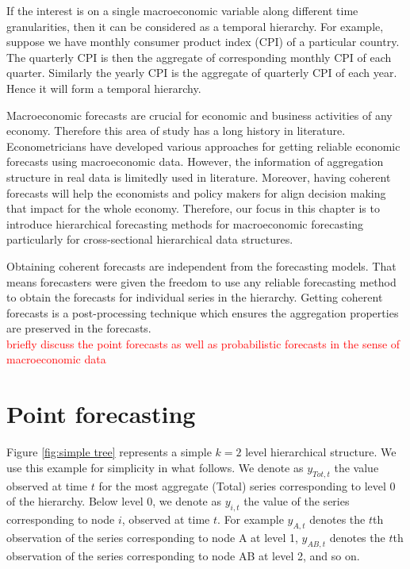 \documentclass[graybox]{svmult}
\begin{document}
If the interest is on a single macroeconomic variable along different time granularities, then it can be considered as a temporal hierarchy. For example, suppose we have monthly consumer product index (CPI) of a particular country. The quarterly CPI is then the aggregate of corresponding monthly CPI of each quarter. Similarly the yearly CPI is the aggregate of quarterly CPI of each year. Hence it will form a temporal hierarchy.

Macroeconomic forecasts are crucial for economic and business activities of any economy. Therefore this area of study has a long history in literature. Econometricians have developed various approaches for getting reliable economic forecasts using macroeconomic data. However, the information of aggregation structure in real data is limitedly used in literature. Moreover, having coherent forecasts will help the economists and policy makers for align decision making that impact for the whole economy. Therefore, our focus in this chapter is to introduce hierarchical forecasting methods for macroeconomic forecasting particularly for cross-sectional hierarchical data structures.

Obtaining coherent forecasts are independent from the forecasting models. That means forecasters were given the freedom to use any reliable forecasting method to obtain the forecasts for individual series in the hierarchy. Getting coherent forecasts is a post-processing technique which ensures the aggregation properties are preserved in the forecasts.   \\


\textcolor{red}{briefly discuss the point forecasts as well as probabilistic forecasts in the sense of macroeconomic data  }

\newpage
\section{Point forecasting}

Figure \ref{fig:simple tree} represents a simple $k=2$ level hierarchical structure. We use this example for simplicity in what follows. We denote as $y_{Tot,t}$ the value observed at time $t$ for the most aggregate (Total) series  corresponding to level 0 of the hierarchy. Below level 0, we denote as $y_{i,t}$ the value of the series corresponding to node $i$, observed at time $t$. For example $y_{A,t}$ denotes the $t$th observation of the series corresponding to node A at level 1, $y_{AB,t}$ denotes the $t$th observation of the series corresponding to node AB at level 2, and so on.
\end{document}
